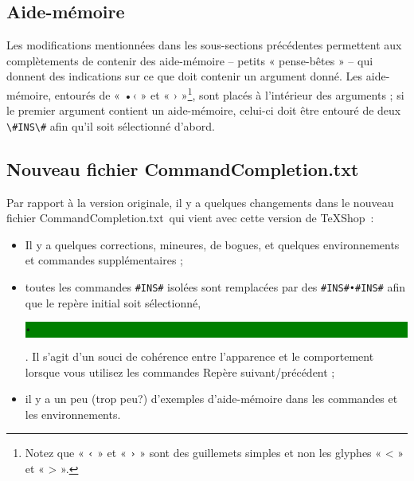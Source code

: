 \documentclass[11pt,french]{article}
\newcommand{\mnu}[1]{\textsf{#1}}
\newcommand{\selmark}{\colorbox{green}{\rule[-0.5ex]{0ex}{2.1ex}\texttt{•}}}
\newcommand{\TS}{\textsf{\TeX Shop}}
\newcommand{\CCT}{\textsf{CommandCompletion.txt}}
\begin{document}
\subsection*{Aide-mémoire}

Les modifications mentionnées dans les sous-sections précédentes permettent aux complètements de contenir des 
aide-mémoire -- petits « pense-bêtes » -- qui donnent des indications sur ce que doit contenir un argument donné. 
Les aide-mémoire, entourés de « •‹ » et « › »\footnote{Notez que « \texttt{‹} » et « \texttt{›} » sont des guillemets simples et non les glyphes « < » et « > ».}, sont placés à l'intérieur des arguments ; si le premier argument contient un aide-mémoire, celui-ci doit être entouré de deux \verb|\#INS\#| afin qu'il soit sélectionné d'abord.


\subsection*{Nouveau fichier \CCT}

Par rapport à la version originale, il y a quelques changements dans le nouveau fichier \CCT\ qui vient avec cette version de \TS\ :
\begin{itemize}
\item Il y a quelques corrections, mineures, de bogues, et quelques environnements et commandes supplémentaires ;
\item toutes les commandes \verb|#INS#| isolées sont remplacées par des \verb|#INS#•#INS#| afin que 
le repère initial soit sélectionné, \selmark. Il s'agit d'un souci de cohérence entre l'apparence et le comportement 
lorsque vous utilisez les commandes \mnu{Repère suivant/précédent} ;
\item il y a un peu (trop peu?) d'exemples d'aide-mémoire dans les commandes et les environnements.
\end{itemize}
\end{document}
